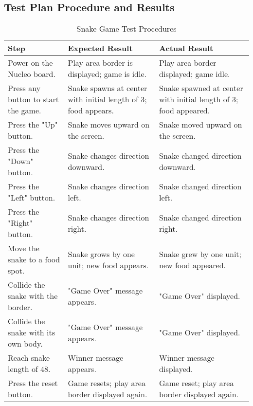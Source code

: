\subsection{Test Plan Procedure and Results}
\begin{table}[h!]
\centering
\renewcommand{\arraystretch}{1.2}
\begin{tabular}{|p{5cm}|p{6cm}|p{4cm}|}
\hline
\textbf{Step} & \textbf{Expected Result} & \textbf{Actual Result} \\
\hline
Power on the Nucleo board. & Play area border is displayed; game is idle. & Play area border displayed; game idle. \\ 
\hline
Press any button to start the game. & Snake spawns at center with initial length of 3; food appears. & Snake spawned at center with initial length of 3; food appeared. \\ 
\hline
Press the "Up" button. & Snake moves upward on the screen. & Snake moved upward on the screen. \\ 
\hline
Press the "Down" button. & Snake changes direction downward. & Snake changed direction downward. \\ 
\hline
Press the "Left" button. & Snake changes direction left. & Snake changed direction left. \\ 
\hline
Press the "Right" button. & Snake changes direction right. & Snake changed direction right. \\ 
\hline
Move the snake to a food spot. & Snake grows by one unit; new food appears. & Snake grew by one unit; new food appeared. \\ 
\hline
Collide the snake with the border. & "Game Over" message appears. & "Game Over" displayed. \\ 
\hline
Collide the snake with its own body. & "Game Over" message appears. & "Game Over" displayed. \\ 
\hline
Reach snake length of 48. & Winner message appears. & Winner message displayed. \\ 
\hline
Press the reset button. & Game resets; play area border displayed again. & Game reset; play area border displayed again. \\ 
\hline
\end{tabular}
\caption{Snake Game Test Procedures}
\label{tab:test_procedures}
\end{table}




